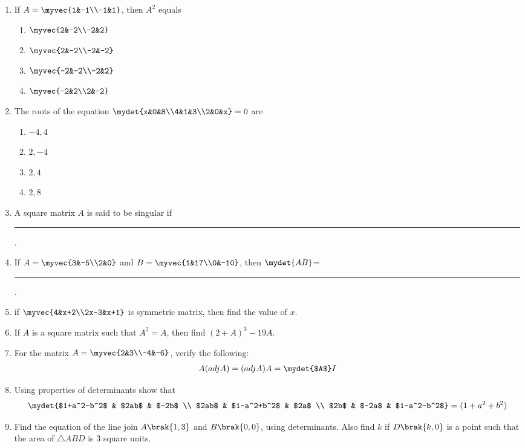 \documentclass{article}
\begin{document}
\begin{enumerate}
\item If $A=\myvec{1&-1\\-1&1}$, then $A^2$ equals 
	\begin{enumerate}
		\item $\myvec{2&-2\\-2&2}$
		\item $\myvec{2&-2\\-2&-2}$
		\item $\myvec{-2&-2\\-2&2}$
		\item $\myvec{-2&2\\2&-2}$
	\end{enumerate}
\item The roots of the equation $\mydet{x&0&8\\4&1&3\\2&0&x}=0$ are
	\begin{enumerate}
		\item $-4,4$
		\item $2,-4$
		\item $2,4$
		\item $2,8$
	\end{enumerate}
\item A square matrix $A$ is said to be singular if \rule{2cm}{0.15mm}.
\item If $A= \myvec{3&-5\\2&0}$ and $B=\myvec{1&17\\0&-10}$, then $\mydet{AB}$= \rule{2cm}{0.15mm}.
\item if $\myvec{4&x+2\\2x-3&x+1}$ is symmetric matrix, then find the value of $x$.
\item If $A$ is a square matrix such that $A^2=A$, then find $(2+A)^3 -19A$.
\item For the matrix $A=\myvec{2&3\\-4&-6}$, verify the following:
	\begin{align}
		A(adj A) = (adj A)A= \mydet{$A$}I
	\end{align}
\item Using properties of determinants show that
	\begin{align}
		\mydet{$1+a^2-b^2$ & $2ab$ & $-2b$ \\ $2ab$ & $1-a^2+b^2$ & $2a$ \\ $2b$ & $-2a$ & $1-a^2-b^2$} = (1+a^2+b^2)
	\end{align}
\item Find the equation of the line join $A\brak{1, 3}$ and $B\brak{0, 0}$, using determinants. Also find $k$ if $D\brak{k,0}$ is a point such that the area of $\triangle ABD$ is $3$ square units.
\end{enumerate}
\end{document}
